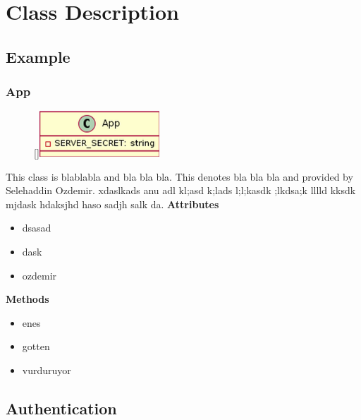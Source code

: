 \section{Class Description}
\subsection{Example}
\subsubsection{App}
\begin{figure}
    \raisebox{0pt}[\dimexpr{}\baselineskip\relax]{\includegraphics[width=4.5cm]{classes/auth/app.png}}
\end{figure} 
\par
This class is blablabla and bla bla bla. This denotes bla bla bla and provided by Selehaddin Ozdemir. xdaslkads anu adl kl;asd k;lads l;l;kasdk ;lkdsa;k lllld kksdk mjdask hdaksjhd haso sadjh salk da.
\newline
\newline
\textbf{Attributes}
\begin{itemize}
    \item dsasad
    \item dask
    \item ozdemir
\end{itemize}
\textbf{Methods}
\begin{itemize}
    \item enes
    \item gotten
    \item vurduruyor
\end{itemize}

\subsection{Authentication}

